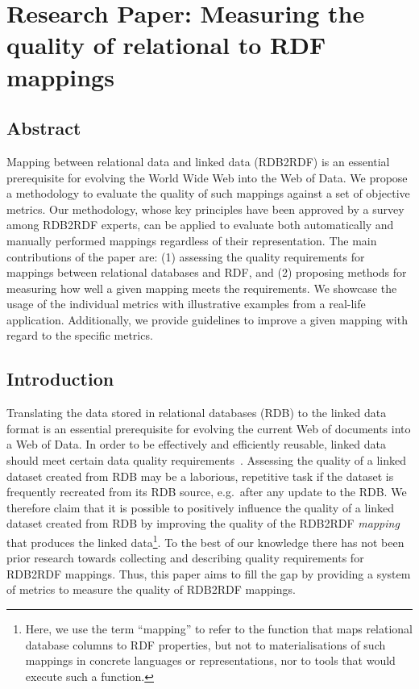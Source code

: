 \chapter{Research Paper: Measuring the quality of relational to RDF mappings}
\label{sec:app_rdb2rdf}

\section{Abstract}
Mapping between relational data and linked data (RDB2RDF) is an essential prerequisite for evolving the World Wide Web into the Web of Data.
We propose a methodology to evaluate the quality of such mappings against a set of objective metrics.
Our methodology, whose key principles have been approved by a survey among RDB2RDF experts, can be applied to evaluate both automatically and manually performed mappings regardless of their representation.
The main contributions of the paper are: (1) assessing the quality requirements for mappings between relational databases and RDF, and (2) proposing methods for measuring how well a given mapping meets the requirements.
We showcase the usage of the individual metrics with illustrative examples from a real-life application.
Additionally, we provide guidelines to improve a given mapping with regard to the specific metrics. 

\section{Introduction}

Translating the data stored in relational databases (RDB) to the linked data format is an essential prerequisite for evolving the current Web of documents into a Web of Data.
In order to be effectively and efficiently reusable, linked data should meet certain data quality requirements~\cite{Zaveri}.
Assessing the quality of a linked dataset created from RDB may be a laborious, repetitive task if the dataset is frequently recreated from its RDB source, e.g.\ after any update to the RDB.
We therefore claim that it is possible to positively influence the quality of a linked dataset created from RDB by improving the quality of the RDB2RDF \emph{mapping} that produces the linked data\footnote{Here, we use the term ``mapping'' to refer to the function that maps relational database columns to RDF properties, but not to materialisations of such mappings in concrete languages or representations, nor to tools that would execute such a function.}.
To the best of our knowledge there has not been prior research towards collecting and describing quality requirements for RDB2RDF mappings.
Thus, this paper aims to fill the gap by providing a system of metrics to measure the quality of RDB2RDF mappings.

